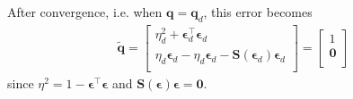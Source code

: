 After convergence, i.e. when $\mathbf{q} = \mathbf{q}_d$, this error becomes
\begin{equation}\begin{aligned}
\tilde{\mathbf{q}} =
\begin{bmatrix}
\eta_d^2 + \boldsymbol{\epsilon}^\top_d \boldsymbol{\epsilon}_d\\
\eta_d \boldsymbol{\epsilon}_d - \eta_d \boldsymbol{\epsilon}_d - \mathbf{S}(\boldsymbol{\epsilon}_d)\boldsymbol{\epsilon}_d\\
\end{bmatrix}
=
\begin{bmatrix}
1\\
\mathbf{0}\\
\end{bmatrix}
\end{aligned}\end{equation}
since $\eta^2 = 1 - \boldsymbol{\epsilon}^\top \boldsymbol{\epsilon}$ and $\boldsymbol{\mathbf{S}}(\boldsymbol{\epsilon})\boldsymbol{\epsilon} = \mathbf{0}$.


